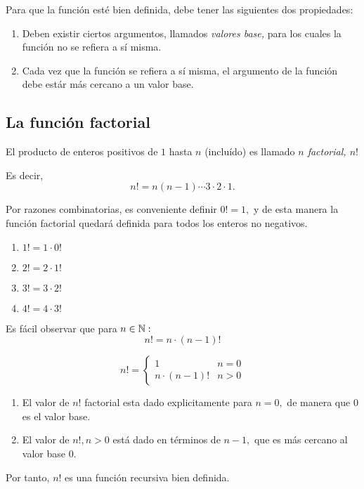 	Para que la función est\'e bien definida, debe tener las siguientes dos propiedades:
	\begin{enumerate}
		\item Deben existir ciertos argumentos, llamados \emph{valores base,} para los cuales la función no se refiera a sí misma.
		\item Cada vez que la función se refiera a sí misma, el argumento de la función debe estár más cercano a un valor base.
	\end{enumerate}



\subsection{La función factorial}


	El producto de enteros positivos de $1$ hasta $n$ (incluído) es llamado \emph{$n$ factorial, $n!$}

	Es decir,
	$$
	n!=n(n-1)\cdots 3\cdot 2 \cdot 1.$$




	Por razones combinatorias, es conveniente definir \emph{$0!=1,$} y de esta manera la función factorial quedará definida para todos los enteros no negativos.



	\begin{observacion}
		\begin{enumerate}
			\item $1!=1\cdot0!$
			\item $2!=2\cdot1!$
			\item $3!=3\cdot2!$
			\item $4!=4\cdot3!$
		\end{enumerate}

	\end{observacion}




	Es fácil observar que para $n \in \mathbb{N}:$
	$$
	n!=n\cdot (n-1)!
	$$



	\begin{definicion}
		$$n!=
		\begin{cases}
			1 & n=0 \\
			n\cdot(n-1)! & n>0
		\end{cases}
		$$
	\end{definicion}




	\begin{observacion}
		\begin{enumerate}
			\item El valor de $n!$ factorial esta dado explicitamente para $n=0,$ de manera que $0$ es el valor base.
			\item El valor de $n!, n>0$ está dado en t\'erminos de $n-1,$ que es más cercano al valor base $0.$
		\end{enumerate}

		Por tanto, $n!$ es una función recursiva bien definida.
	\end{observacion}



